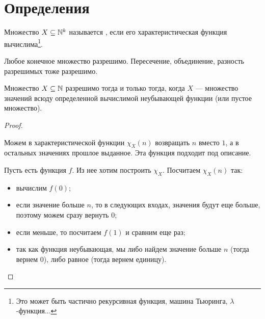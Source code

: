 \section{Определения}
\begin{defn}
	Множество $ X \subseteq \mathbb{N}^{k}$ называется , если его характеристическая функция вычислима\footnote{Это может быть частично рекурсивная функция, машина Тьюринга, $ \lambda$-функция...}.
\end{defn}
\begin{note}
    Любое конечное множество разрешимо. Пересечение, объединение, разность разрешимых тоже разрешимо.
\end{note}
\begin{thm}
	Множество $ X \subseteq \mathbb{N}$ разрешимо тогда и только тогда, когда $ X$ --- множество значений всюду определенной вычислимой неубывающей функции (или пустое множество).
\end{thm}
\begin{proof}
	~\begin{description}
		\item {} Можем в характеристической функции $ \chi_{X}(n)$ возвращать $ n$ вместо $ 1$, а в остальных значениях прошлое выданное. Эта функция подходит под описание.
        \item {} 
			Пусть есть функция $ f$. Из нее хотим построить $ \chi_{X}$. Посчитаем $ \chi_{X}(n)$ так: 
			\begin{itemize}
				\item вычислим $ f(0)$;
				\item если значение больше $ n$, то в следующих входах, значения будут еще больше, поэтому можем сразу вернуть  $ 0$;
				\item если меньше, то посчитаем $ f(1)$ и сравним еще раз;
				\item так как функция неубывающая, мы либо найдем значение больше $ n$ (тогда вернем $ 0$), либо равное (тогда вернем единицу).
			\end{itemize}
    \end{description} 
\end{proof}



